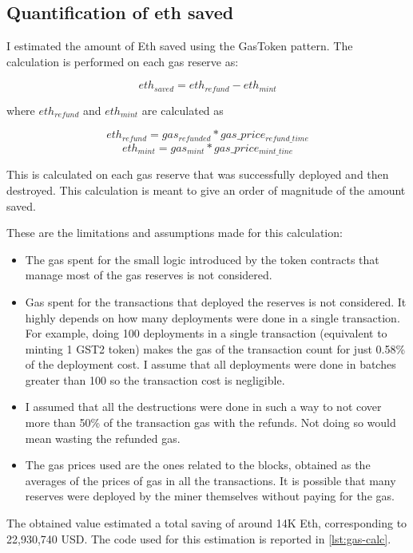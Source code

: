 \subsection{Quantification of eth saved}

I estimated the amount of Eth saved using the GasToken pattern. The calculation is performed on each gas reserve as:

\[eth_{saved}=eth_{refund}-eth_{mint}\]

\noindent where $eth_{refund}$ and $eth_{mint}$ are calculated as

\[eth_{refund} = gas_{refunded}*gas\_price_{refund\_ time}\]
\[eth_{mint}=gas_{mint}*gas\_price_{mint\_tine}\]

This is calculated on each gas reserve that was successfully deployed and then destroyed. This calculation is meant to give an order of magnitude of the amount saved.

These are the limitations and assumptions made for this calculation:

\begin{itemize}

    \item The gas spent for the small logic introduced by the token contracts that manage most of the gas reserves is not considered.
    
    \item Gas spent for the transactions that deployed the reserves is not considered. It highly depends on how many deployments were done in a single transaction. For example, doing 100 deployments in a single transaction (equivalent to minting 1 GST2 token) makes the gas of the transaction count for just 0.58\% of the deployment cost. I assume that all deployments were done in batches greater than 100 so the transaction cost is negligible.

    \item I assumed that all the destructions were done in such a way to not cover more than 50\% of the transaction gas with the refunds. Not doing so would mean wasting the refunded gas. 

    \item The gas prices used are the ones related to the blocks, obtained as the averages of the prices of gas in all the transactions. It is possible that many reserves were deployed by the miner themselves without paying for the gas.
    
\end{itemize}

The obtained value estimated a total saving of around 14K Eth, corresponding to 22,930,740 USD. The code used for this estimation is reported in \cref{lst:gas-calc}.


